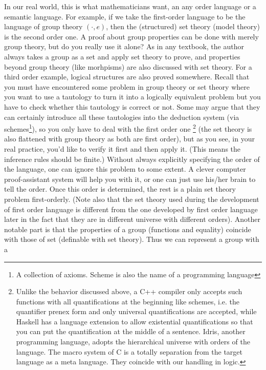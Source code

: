 In our real world, this is what mathematicians want, an any order
language or a semantic language. For example, if we take the 
first-order language to be the language of group theory $(\cdot,e)$, 
then the (structured) set theory (model theory) is the second order one.
A proof about group properties can be done with merely group theory,
but do you really use it alone? As in any textbook, the author always
takes a group as a set and apply set theory to prove, and properties
beyond group theory (like morhpisms) are also discussed with set
theory. For a third order example, logical structures are also proved
somewhere. Recall that you must have encountered some problem in
group theory or set theory where you want to use a tautology to turn 
it into a logically equivalent problem but you have to check whether 
this tautology is correct or not. Some may argue that they can certainly 
introduce all these tautologies
into the deduction system (via schemes\footnote{A collection of
axioms. Scheme is also the name of a programming language}), so you 
only have to deal with the first order one \footnote{Unlike the behavior 
discussed above, a C++ compiler only accepts such functions with all 
quantifications at the beginning like schemes, i.e. the quantifier 
prenex form and only universal quantifications are accepted, while 
Haskell has a language extension to allow existential quantifications 
so that you can put the quantification at the middle of a sentence.
Idris, another programming language, adopts the hierarchical universe
with orders of the language. The macro system of C is a totally 
separation from the target language as a meta language. They coincide
with our handling in logic.} (the set theory is also flattened with
group theory as both are first order), but as you see, in your real 
practice, you'd like to verify it first and then apply it. (This means
the inference rules should be finite.) Without always 
explicitly specifying the order of the language, one can ignore this 
problem to some extent. A clever computer proof-assistant system will 
help you with it, or one can just use his/her brain to tell the order. 
Once this order is determined, the rest is a plain set theory problem 
first-orderly. (Note also that the set theory used during the 
development of first order language is different from the one developed 
by first order language later in the fact that they are in different
universe with different orders). Another notable part is that the
properties of a group (functions and equality) coincide with those of 
set (definable with set theory). Thus we can represent a group with a
